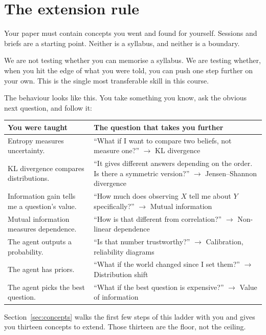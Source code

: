 \documentclass[11pt,a4paper]{article}
\begin{document}
\section{The extension rule}
\label{sec:nottaught}

Your paper must contain concepts you went and found for yourself. Sessions and briefs are a
starting point. Neither is a syllabus, and neither is a boundary.

We are not testing whether you can memorise a syllabus. We are testing whether, when you hit
the edge of what you were told, you can push one step further on your own. This is the single
most transferable skill in this course.

The behaviour looks like this. You take something you know, ask the obvious next question, and
follow it:

\begin{center}
\begin{tabular}{@{}L{7.6cm}L{7.2cm}@{}}
\toprule
\textbf{You were taught} & \textbf{The question that takes you further} \\
\midrule
Entropy measures uncertainty. & ``What if I want to compare two beliefs, not measure one?'' $\rightarrow$ KL divergence \\
KL divergence compares distributions. & ``It gives different answers depending on the order. Is there a symmetric version?'' $\rightarrow$ Jensen--Shannon divergence \\
Information gain tells me a question's value. & ``How much does observing $X$ tell me about $Y$ specifically?'' $\rightarrow$ Mutual information \\
Mutual information measures dependence. & ``How is that different from correlation?'' $\rightarrow$ Non-linear dependence \\
The agent outputs a probability. & ``Is that number trustworthy?'' $\rightarrow$ Calibration, reliability diagrams \\
The agent has priors. & ``What if the world changed since I set them?'' $\rightarrow$ Distribution shift \\
The agent picks the best question. & ``What if the best question is expensive?'' $\rightarrow$ Value of information \\
\bottomrule
\end{tabular}
\end{center}

Section~\ref{sec:concepts} walks the first few steps of this ladder with you and gives you
thirteen concepts to extend. Those thirteen are the floor, not the ceiling.
\end{document}

